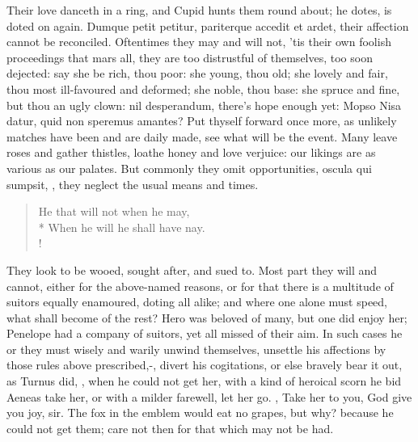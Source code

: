 Their love danceth in a ring, and Cupid hunts them round about; he
dotes, is doted on again. Dumque petit petitur, pariterque accedit et
ardet, their affection cannot be reconciled. Oftentimes they may and
will not, 'tis their own foolish proceedings that mars all, they are
too distrustful of themselves, too soon dejected: say she be rich, thou
poor: she young, thou old; she lovely and fair, thou most ill-favoured
and deformed; she noble, thou base: she spruce and fine, but thou an
ugly clown: nil desperandum, there's hope enough yet: Mopso Nisa datur,
quid non speremus amantes? Put thyself forward once more, as unlikely
matches have been and are daily made, see what will be the event. Many
leave roses and gather thistles, loathe honey and love verjuice: our
likings are as various as our palates. But commonly they omit
opportunities, oscula qui sumpsit, \etc{}, they neglect the usual means
and times.

\begin{verse}%
He that will not when he may,\\*
When he will he shall have nay.\\!
\end{verse}%

They look to be wooed, sought after, and sued to. Most part they will
and cannot, either for the above-named reasons, or for that there is a
multitude of suitors equally enamoured, doting all alike; and where one
alone must speed, what shall become of the rest? Hero was beloved of
many, but one did enjoy her; Penelope had a company of suitors, yet all
missed of their aim. In such cases he or they must wisely and warily
unwind themselves, unsettle his affections by those rules above
prescribed,-, divert his cogitations,
or else bravely bear it out, as Turnus did, ,
when he could not get her, with a kind of heroical scorn he bid Aeneas
take her, or with a milder farewell, let her go. , Take her to you, God give you joy, sir. The fox in the emblem
would eat no grapes, but why? because he could not get them; care not
then for that which may not be had.

